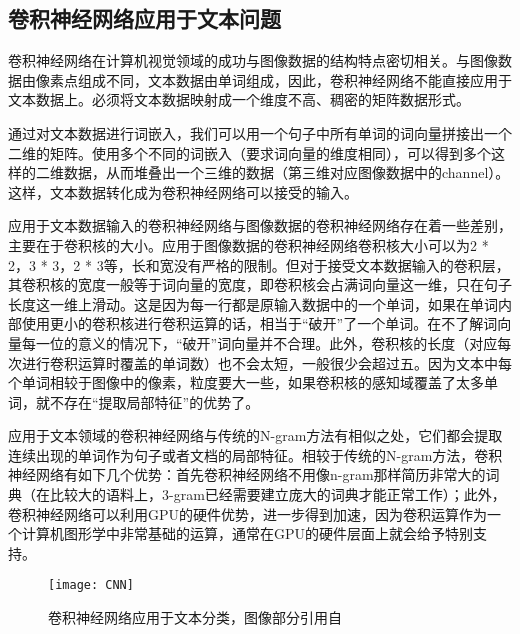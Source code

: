 \subsection{卷积神经网络应用于文本问题}
卷积神经网络在计算机视觉领域的成功与图像数据的结构特点密切相关。与图像数据由像素点组成不同，文本数据由单词组成，因此，卷积神经网络不能直接应用于文本数据上。必须将文本数据映射成一个维度不高、稠密的矩阵数据形式。

通过对文本数据进行词嵌入，我们可以用一个句子中所有单词的词向量拼接出一个二维的矩阵。使用多个不同的词嵌入（要求词向量的维度相同），可以得到多个这样的二维数据，从而堆叠出一个三维的数据（第三维对应图像数据中的channel）。这样，文本数据转化成为卷积神经网络可以接受的输入。

应用于文本数据输入的卷积神经网络与图像数据的卷积神经网络存在着一些差别，主要在于卷积核的大小。应用于图像数据的卷积神经网络卷积核大小可以为2 * 2，3 * 3，2 * 3等，长和宽没有严格的限制。但对于接受文本数据输入的卷积层，其卷积核的宽度一般等于词向量的宽度，即卷积核会占满词向量这一维，只在句子长度这一维上滑动。这是因为每一行都是原输入数据中的一个单词，如果在单词内部使用更小的卷积核进行卷积运算的话，相当于“破开”了一个单词。在不了解词向量每一位的意义的情况下，“破开”词向量并不合理。此外，卷积核的长度（对应每次进行卷积运算时覆盖的单词数）也不会太短，一般很少会超过五。因为文本中每个单词相较于图像中的像素，粒度要大一些，如果卷积核的感知域覆盖了太多单词，就不存在“提取局部特征”的优势了。

应用于文本领域的卷积神经网络与传统的N-gram方法有相似之处，它们都会提取连续出现的单词作为句子或者文档的局部特征。相较于传统的N-gram方法，卷积神经网络有如下几个优势：首先卷积神经网络不用像n-gram那样简历非常大的词典（在比较大的语料上，3-gram已经需要建立庞大的词典才能正常工作）；此外，卷积神经网络可以利用GPU的硬件优势，进一步得到加速，因为卷积运算作为一个计算机图形学中非常基础的运算，通常在GPU的硬件层面上就会给予特别支持。

\begin{figure}[ht]
\centering
\texttt{[image: CNN]}
\caption{卷积神经网络应用于文本分类，图像部分引用自\cite{kim.2014.convolutional}} \label{fig:CNN}
\end{figure}

